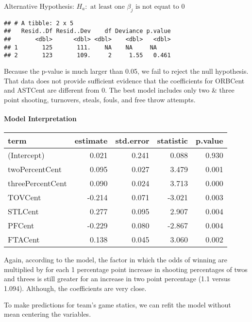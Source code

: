 \documentclass[
]{article}
\begin{document}
Alternative Hypothesis:
\(H_a: \text { at least one } \beta_j \text { is not equat to 0}\)

\begin{verbatim}
## # A tibble: 2 x 5
##   Resid..Df Resid..Dev    df Deviance p.value
##       <dbl>      <dbl> <dbl>    <dbl>   <dbl>
## 1       125       111.    NA    NA     NA    
## 2       123       109.     2     1.55   0.461
\end{verbatim}

Because the p-value is much larger than 0.05, we fail to reject the null
hypothesis. That data does not provide sufficient evidence that the
coefficients for ORBCent and ASTCent are different from 0. The best
model includes only two \& three point shooting, turnovers, steals,
fouls, and free throw attempts.

\hypertarget{model-interpretation}{%
\paragraph{Model Interpretation}\label{model-interpretation}}

\begin{longtable}[]{@{}lrrrr@{}}
\toprule
term & estimate & std.error & statistic & p.value \\
\midrule
\endhead
(Intercept) & 0.021 & 0.241 & 0.088 & 0.930 \\
twoPercentCent & 0.095 & 0.027 & 3.479 & 0.001 \\
threePercentCent & 0.090 & 0.024 & 3.713 & 0.000 \\
TOVCent & -0.214 & 0.071 & -3.021 & 0.003 \\
STLCent & 0.277 & 0.095 & 2.907 & 0.004 \\
PFCent & -0.229 & 0.080 & -2.867 & 0.004 \\
FTACent & 0.138 & 0.045 & 3.060 & 0.002 \\
\bottomrule
\end{longtable}

Again, according to the model, the factor in which the odds of winning
are multiplied by for each 1 percentage point increase in shooting
percentages of twos and threes is still greater for an increase in two
point percentage (1.1 versus 1.094). Although, the coefficients are very
close.

To make predictions for team's game statics, we can refit the model
without mean centering the variables.
\end{document}
